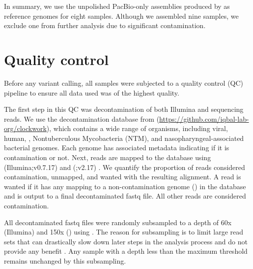In summary, we use the unpolished PacBio-only assemblies produced by \flye{} as reference genomes for eight samples. Although we assembled nine samples, we exclude one from further analysis due to significant contamination.


\section{Quality control}
\label{sec:ch2-qc}

Before any variant calling, all samples were subjected to a quality control (QC) pipeline to ensure all data used was of the highest quality. 

The first step in this QC was decontamination of both Illumina and \ont{} sequencing reads. We use the decontamination database from  (\url{https://github.com/iqbal-lab-org/clockwork}), which contains a wide range of organisms, including viral, human, \mtb{}, Nontuberculous Mycobacteria (NTM), and nasopharyngeal-associated bacterial genomes. Each genome has associated metadata indicating if it is contamination or not. Next, reads are mapped to the database using  (Illumina;v0.7.17) \cite{li2013} and  (\ont{};v2.17) \cite{li2018}. We quantify the proportion of reads considered contamination, unmapped, and wanted with the resulting alignment. A read is wanted if it has any mapping to a non-contamination genome (\mtb{}) in the database and is output to a final decontaminated fastq file. All other reads are considered contamination. 

All decontaminated fastq files were randomly subsampled to a depth of 60x (Illumina) and 150x (\ont{}) using  \cite{rasusa2019}. The reason for subsampling is to limit large read sets that can drastically slow down later steps in the analysis process and do not provide any benefit \cite{demaio2019}. Any sample with a depth less than the maximum threshold remains unchanged by this subsampling.  

